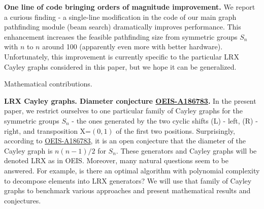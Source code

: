 \documentclass[atmp]{ipart_v1}
\numberwithin{equation}{section}
\theoremstyle{plain}%
\begin{document}
{\bf One line of code bringing orders of magnitude improvement.} We report a curious finding - a single-line modification in the code of our main graph pathfinding module (beam search) dramatically improves performance. This enhancement increases the feasible pathfinding size from symmetric groups $S_n$ with $n$ to $n$ around 100 (apparently even more with better hardware). Unfortunately, this improvement is currently specific to the particular LRX Cayley graphs considered in this paper, but we hope it can be generalized. 


Mathematical contributions. %

{\bf LRX Cayley graphs. Diameter conjecture \href{https://oeis.org/A186783}{OEIS-A186783}.} In the present paper, we restrict ourselves to one particular family of Cayley graphs for the symmetric groups $S_n$ - the ones generated by the two cyclic shifts (L) - left, (R) - right, and transposition X=$(0,1)$ of the first two positions. Surprisingly, according to \href{https://oeis.org/A186783}{OEIS-A186783}, it is an open conjecture that the diameter of the Cayley graph is $n(n-1)/2$ for $S_n$. These generators and Cayley graphs will be denoted LRX as in OEIS. 
 Moreover, many natural questions seem to be answered. For example, is there an optimal algorithm with polynomial complexity to decompose elements into LRX generators? We will use that family of Cayley graphs to benchmark various approaches and present mathematical results and conjectures. 
\end{document}
